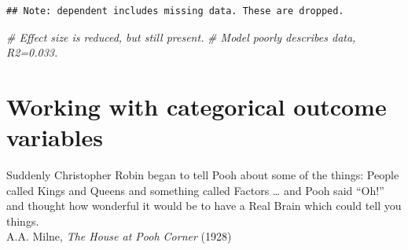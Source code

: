 \documentclass[
  12pt,
  krantz2]{krantz}
\makeatletter
\newenvironment{Shaded}{\begin{snugshade}}{\end{snugshade}}
\newcommand{\CommentTok}[1]{\textcolor[rgb]{0.56,0.35,0.01}{\textit{#1}}}
\newcommand{\DataTypeTok}[1]{\textcolor[rgb]{0.13,0.29,0.53}{#1}}
\newcommand{\DecValTok}[1]{\textcolor[rgb]{0.00,0.00,0.81}{#1}}
\newcommand{\FloatTok}[1]{\textcolor[rgb]{0.00,0.00,0.81}{#1}}
\newcommand{\KeywordTok}[1]{\textcolor[rgb]{0.13,0.29,0.53}{\textbf{#1}}}
\newcommand{\NormalTok}[1]{#1}
\newcommand{\OperatorTok}[1]{\textcolor[rgb]{0.81,0.36,0.00}{\textbf{#1}}}
\newcommand{\OtherTok}[1]{\textcolor[rgb]{0.56,0.35,0.01}{#1}}
\newcommand{\StringTok}[1]{\textcolor[rgb]{0.31,0.60,0.02}{#1}}
\renewenvironment{quote}{\begin{VF}}{\end{VF}}
\newenvironment{kframe}{%
\medskip{}
\setlength{\fboxsep}{.8em}
 \def\at@end@of@kframe{}%
 \ifinner\ifhmode%
  \def\at@end@of@kframe{\end{minipage}}%
  \begin{minipage}{\columnwidth}%
 \fi\fi%
 \def\FrameCommand##1{\hskip\@totalleftmargin \hskip-\fboxsep
 \colorbox{shadecolor}{##1}\hskip-\fboxsep
     \hskip-\linewidth \hskip-\@totalleftmargin \hskip\columnwidth}%
 \MakeFramed {\advance\hsize-\width
   \@totalleftmargin\z@ \linewidth\hsize
   \@setminipage}}%
 {\par\unskip\endMakeFramed%
 \at@end@of@kframe}
\renewenvironment{Shaded}{\begin{kframe}}{\end{kframe}}
\makeatother
\begin{document}
\begin{Shaded}
\end{Shaded}

\begin{verbatim}
## Note: dependent includes missing data. These are dropped.
\end{verbatim}

\begin{Shaded}
\begin{Highlighting}[]
\CommentTok{# Effect size is reduced, but still present. }
\CommentTok{# Model poorly describes data, R2=0.033.}
\end{Highlighting}
\end{Shaded}

\hypertarget{chap08-h1}{%
\chapter{Working with categorical outcome variables}\label{chap08-h1}}


\begin{quote}
Suddenly Christopher Robin began to tell Pooh about some of the things: People called Kings and Queens and something called Factors \ldots{} and Pooh said ``Oh!'' and thought how wonderful it would be to have a Real Brain which could tell you things.\\
A.A. Milne, \emph{The House at Pooh Corner} (1928)
\end{quote}
\end{document}
